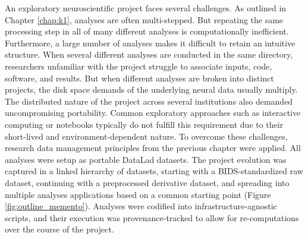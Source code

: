 An exploratory neuroscientific project faces several challenges.
As outlined in Chapter \ref{chap:k1}, analyses are often multi-stepped.
But repeating the same processing step in all of many different analyses is computationally inefficient.
Furthermore, a large number of analyses makes it difficult to retain an intuitive structure.
When several different analyses are conducted in the same directory, researchers unfamiliar with the project struggle to associate inputs, code, software, and results.
But when different analyses are broken into distinct projects, the disk space demands of the underlying neural data usually multiply.
The distributed nature of the project across several institutions also demanded uncompromising portability.
Common exploratory approaches such as interactive computing or notebooks typically do not fulfill this requirement due to their short-lived and environment-dependent nature.
To overcome these challenges, research data management principles from the previous chapter were applied.
All analyses were setup as portable DataLad datasets.
The project evolution was captured in a linked hierarchy of datasets, starting with a BIDS-standardized raw dataset, continuing with a preprocessed derivative dataset, and spreading into multiple analyses applications based on a common starting point (Figure \ref{fig:outline_memento}).
Analyses were codified into infrastructure-agnostic scripts, and their execution was provenance-tracked to allow for re-computations over the course of the project.

